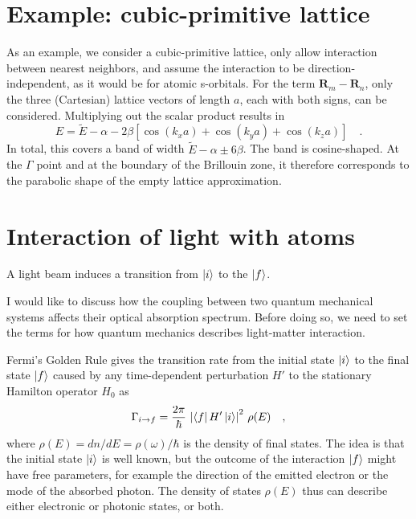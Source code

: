 \section{Example: cubic-primitive lattice}

As an example, we consider a cubic-primitive lattice, only allow interaction between nearest neighbors, and assume the interaction to be direction-independent, as it would be for atomic s-orbitals. For the term $\mathbf{R}_m - \mathbf{R}_n$, only the three (Cartesian) lattice vectors of length $a$, each with both signs, can be considered. Multiplying out the scalar product results in
\begin{equation}
    E = \tilde{E} - \alpha - 2 \beta \left[ \cos( k_x a ) + \cos( k_y a ) + \cos( k_z a ) \right] \quad .
\end{equation}
In total, this covers a band of width $\tilde{E} - \alpha \pm 6 \beta $. The band is cosine-shaped. At the $\Gamma$ point and at the boundary of the Brillouin zone, it therefore corresponds to the parabolic shape of the empty lattice approximation.





\section{Interaction of light with atoms}

\begin{marginfigure}
\caption{A light beam induces a transition from $\ket{i}$ to the  $\ket{f}$.}
\end{marginfigure}
I would like to discuss how the coupling between two quantum mechanical systems affects their optical absorption spectrum. Before doing so, we need to set the terms for how quantum mechanics describes light-matter interaction.

Fermi's Golden Rule gives the transition rate from the initial state $\ket{i}$ to the final state $\ket{f}$ caused by any time-dependent perturbation $H'$ to the stationary Hamilton operator $H_0$ as
\begin{equation}
 \Gamma_{i \rightarrow f} = \frac{2 \pi}{\hbar} \, \left| \bra{f} H' \ket{i} \right|^2 \, \rho(E) \quad ,
\end{equation}
where  $\rho(E) = d n / d E = \rho(\omega) / \hbar$ is the density of final states. The idea is that the initial state  $\ket{i}$ is well known, but the outcome of the interaction $\ket{f}$ might have free parameters, for example the direction of the emitted electron or the mode of the absorbed photon. The density of states   $\rho(E)$ thus can describe either electronic or photonic states, or both.




